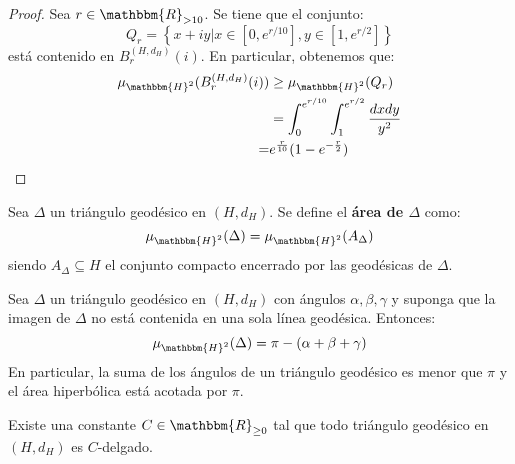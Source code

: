 \documentclass[12pt]{report}
\theoremstyle{largebreak}
\newcommand{\bbm}[1]{\ensuremath{\mathbbm{#1}}}
\begin{document}
    \begin{proof}
        Sea $r\in\bbm{R}_{>10}$. Se tiene que el conjunto:
        \begin{equation*}
            Q_r=\left\{x+iy\Big|x\in[0,e^{ r/10}],y\in[1,e^{r/2}] \right\}
        \end{equation*}
        está contenido en $B_r^{(H,d_H)}(i)$. En particular, obtenemos que:
        \begin{equation*}
            \begin{split}
                \mu_{\bbm{H}^2}(B_r^{(H,d_H)}(i))&\geq\mu_{\bbm{H}^2}(Q_r)\\
                &=\int_{0}^{e^{r/10}}\int_{1}^{e^{r/2}}\frac{dxdy}{y^2}\\
                =&e^{\frac{r}{10}}(1-e^{-\frac{r}{2}})\\
            \end{split}
        \end{equation*}
    \end{proof}

    \begin{mydef}
        Sea $\Delta$ un triángulo geodésico en $(H,d_H)$. Se define el \textbf{área de $\Delta$} como:
        \begin{equation*}
            \mu_{\bbm{H}^2}(\Delta)=\mu_{\bbm{H}^2}(A_\Delta)
        \end{equation*}
        siendo $A_\Delta\subseteq H$ el conjunto compacto encerrado por las geodésicas de $\Delta$.
    \end{mydef}

    \begin{theor}
        Sea $\Delta$ un triángulo geodésico en $(H,d_H)$ con ángulos $\alpha,\beta,\gamma$ y suponga que la imagen de $\Delta$ no está contenida en una sola línea geodésica. Entonces:
        \begin{equation*}
            \mu_{\bbm{H}^2}(\Delta)=\pi-(\alpha+\beta+\gamma)
        \end{equation*}
        En particular, la suma de los ángulos de un triángulo geodésico es menor que $\pi$ y el área hiperbólica está acotada por $\pi$.
    \end{theor}

    \begin{theor}
        Existe una constante $C\in\bbm{R}_{\geq0}$ tal que todo triángulo geodésico en $(H,d_H)$ es $C$-delgado.
    \end{theor}
\end{document}
